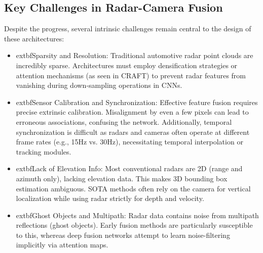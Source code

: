 \subsection{Key Challenges in Radar-Camera Fusion}

Despite the progress, several intrinsic challenges remain central to the design of these architectures:

\begin{itemize}
    \item 	extbf{Sparsity and Resolution}: Traditional automotive radar point clouds are incredibly sparse. Architectures must employ densification strategies or attention mechanisms (as seen in CRAFT) to prevent radar features from vanishing during down-sampling operations in CNNs.
    \item 	extbf{Sensor Calibration and Synchronization}: Effective feature fusion requires precise extrinsic calibration. Misalignment by even a few pixels can lead to erroneous associations, confusing the network. Additionally, temporal synchronization is difficult as radars and cameras often operate at different frame rates (e.g., 15Hz vs. 30Hz), necessitating temporal interpolation or tracking modules.
    \item 	extbf{Lack of Elevation Info}: Most conventional radars are 2D (range and azimuth only), lacking elevation data. This makes 3D bounding box estimation ambiguous. SOTA methods often rely on the camera for vertical localization while using radar strictly for depth and velocity.
    \item 	extbf{Ghost Objects and Multipath}: Radar data contains noise from multipath reflections (ghost objects). Early fusion methods are particularly susceptible to this, whereas deep fusion networks attempt to learn noise-filtering implicitly via attention maps.
\end{itemize}
